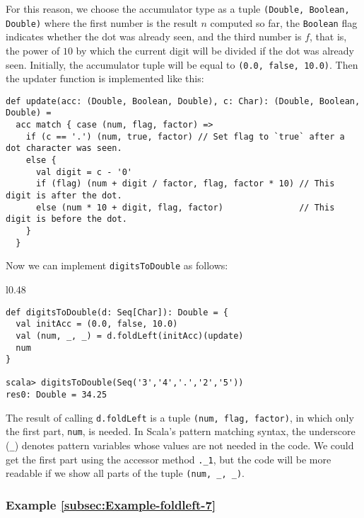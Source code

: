 For this reason, we choose the accumulator type as a tuple \lstinline!(Double, Boolean, Double)!
where the first number is the result $n$ computed so far, the \lstinline!Boolean!
flag indicates whether the dot was already seen, and the third number
is $f$, that is, the power of $10$ by which the current digit will
be divided if the dot was already seen. Initially, the accumulator
tuple will be equal to \lstinline!(0.0, false, 10.0)!. Then the updater
function is implemented like this:
\begin{lstlisting}
def update(acc: (Double, Boolean, Double), c: Char): (Double, Boolean, Double) =
  acc match { case (num, flag, factor) =>
    if (c == '.') (num, true, factor) // Set flag to `true` after a dot character was seen.
    else {
      val digit = c - '0'
      if (flag) (num + digit / factor, flag, factor * 10) // This digit is after the dot.
      else (num * 10 + digit, flag, factor)               // This digit is before the dot.
    }
  }
\end{lstlisting}
Now we can implement \lstinline!digitsToDouble! as follows:

\begin{wrapfigure}{l}{0.48\columnwidth}%
\vspace{-0.5\baselineskip}
\begin{lstlisting}
def digitsToDouble(d: Seq[Char]): Double = {
  val initAcc = (0.0, false, 10.0)
  val (num, _, _) = d.foldLeft(initAcc)(update)
  num
}

scala> digitsToDouble(Seq('3','4','.','2','5'))
res0: Double = 34.25
\end{lstlisting}

\vspace{-1.2\baselineskip}
\end{wrapfigure}%

\noindent The result of calling \lstinline!d.foldLeft! is a tuple
\lstinline!(num, flag, factor)!, in which only the first part, \lstinline!num!,
is needed. In Scala\textsf{'}s pattern matching syntax, the underscore (\lstinline!_!)
denotes pattern variables whose values are not needed in the code.
We could get the first part using the accessor method \lstinline!._1!,
but the code will be more readable if we show all parts of the tuple
\lstinline!(num, _, _)!.

\subsubsection{Example \label{subsec:Example-foldleft-7}\ref{subsec:Example-foldleft-7}}

